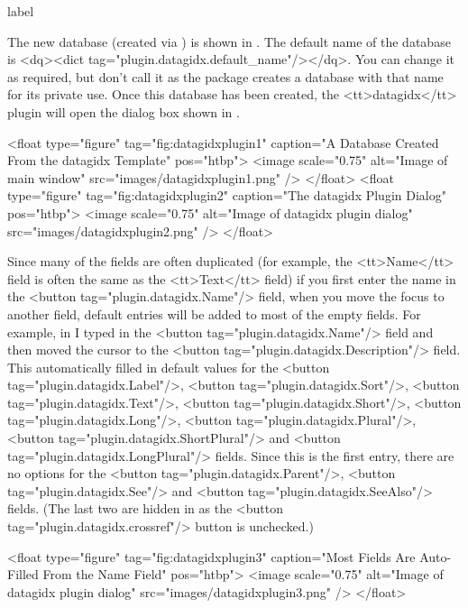 \begin{example}{label}{}

   The new database (created via ) is
   shown in . The default name of the database
   is <dq><dict tag="plugin.datagidx.default_name"/></dq>. You can change it 
   as required, but don't call it  as the  
   package creates a database with that name for its private use.
   Once this database has been created, the <tt>datagidx</tt> plugin will 
   open the dialog box shown in .

     <float type="figure" tag="fig:datagidxplugin1" caption="A Database Created From the datagidx Template" pos="htbp">
      <image scale="0.75" alt="Image of main window" src="images/datagidxplugin1.png" />
     </float>
     <float type="figure" tag="fig:datagidxplugin2" caption="The datagidx Plugin Dialog" pos="htbp">
      <image scale="0.75" alt="Image of datagidx plugin dialog" src="images/datagidxplugin2.png" />
     </float>

   Since many of the fields are often duplicated (for example, the 
   <tt>Name</tt> field is often the same as the <tt>Text</tt> field)
   if you first enter the name in the <button tag="plugin.datagidx.Name"/>
   field, when you move the focus to another field, default entries will 
   be added to most of the empty fields. For example, in 
    I typed  in the
   <button tag="plugin.datagidx.Name"/> field and then moved the cursor to
   the <button tag="plugin.datagidx.Description"/> field. This automatically
   filled in default values for the <button tag="plugin.datagidx.Label"/>,
   <button tag="plugin.datagidx.Sort"/>,
   <button tag="plugin.datagidx.Text"/>,
   <button tag="plugin.datagidx.Short"/>,
   <button tag="plugin.datagidx.Long"/>,
   <button tag="plugin.datagidx.Plural"/>,
   <button tag="plugin.datagidx.ShortPlural"/> and
   <button tag="plugin.datagidx.LongPlural"/> fields.
   Since this is the first entry, there are no options for the
   <button tag="plugin.datagidx.Parent"/>,
   <button tag="plugin.datagidx.See"/> and 
   <button tag="plugin.datagidx.SeeAlso"/> fields. (The last two are hidden in
    as the <button tag="plugin.datagidx.crossref"/>
   button is unchecked.)

     <float type="figure" tag="fig:datagidxplugin3" caption="Most Fields Are Auto-Filled From the Name Field" pos="htbp">
      <image scale="0.75" alt="Image of datagidx plugin dialog" src="images/datagidxplugin3.png" />
     </float>


\end{example}
